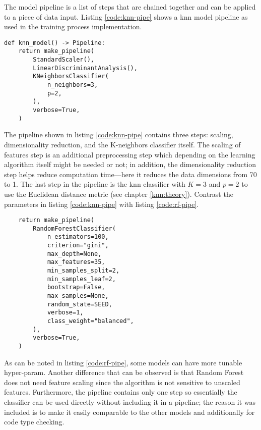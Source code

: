 The model pipeline is a list of steps that are chained together and can be applied to a piece of data input.
Listing \ref{code:knn-pipe} shows a \gls{knn} model pipeline as used in the training process implementation.
\clearpage

\begin{code}
    \begin{verbatim}
def knn_model() -> Pipeline:
    return make_pipeline(
        StandardScaler(),
        LinearDiscriminantAnalysis(),
        KNeighborsClassifier(
            n_neighbors=3,
            p=2,
        ),
        verbose=True,
    )
    \end{verbatim}
\label{code:knn-pipe}
\end{code}

The pipeline shown in listing \ref{code:knn-pipe} contains three steps: scaling, dimensionality reduction, and the K-neighbors classifier itself.
The scaling of features step is an additional preprocessing step which depending on the learning algorithm itself might be needed or not;
in addition, the dimensionality reduction step helps reduce computation time---here it reduces the data dimensions from 70 to 1.
The last step in the pipeline is the \gls{knn} classifier with $K=3$ and $p=2$ to use the Euclidean distance metric (see chapter \ref{knn:theory}).
Contrast the parameters in listing \ref{code:knn-pipe} with listing \ref{code:rf-pipe}.

\begin{code}
\begin{verbatim}
    return make_pipeline(
        RandomForestClassifier(
            n_estimators=100,
            criterion="gini",
            max_depth=None,
            max_features=35,
            min_samples_split=2,
            min_samples_leaf=2,
            bootstrap=False,
            max_samples=None,
            random_state=SEED,
            verbose=1,
            class_weight="balanced",
        ),
        verbose=True,
    )
\end{verbatim}
\label{code:rf-pipe}
\end{code}

\clearpage
As can be noted in listing \ref{code:rf-pipe}, some models can have more tunable \gls{hyper-param}.
Another difference that can be observed is that Random Forest does not need feature scaling since the algorithm is not sensitive to unscaled features.
Furthermore, the pipeline contains only one step so essentially the classifier can be used directly without including it in a pipeline;
the reason it was included is to make it easily comparable to the other models and additionally for code type checking.

